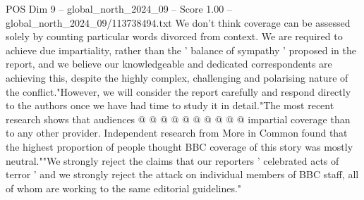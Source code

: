 \begin{textsample}{POS Dim 9 – global\_north\_2024\_09 – Score 1.00 – global\_north\_2024\_09/113738494.txt}
We don't think coverage can be assessed solely by counting particular words divorced from context.
We are required to achieve due impartiality, rather than the ' balance of sympathy ' proposed in the report, and we believe our knowledgeable and dedicated correspondents are achieving this, despite the highly complex, challenging and polarising nature of the conflict."However, we will consider the report carefully and respond directly to the authors once we have had time to study it in detail."The most recent research shows that audiences @ @ @ @ @ @ @ @ @ @ impartial coverage than to any other provider.
Independent research from More in Common found that the highest proportion of people thought BBC coverage of this story was mostly neutral.""We strongly reject the claims that our reporters ' celebrated acts of terror ' and we strongly reject the attack on individual members of BBC staff, all of whom are working to the same editorial guidelines."

\end{textsample}
